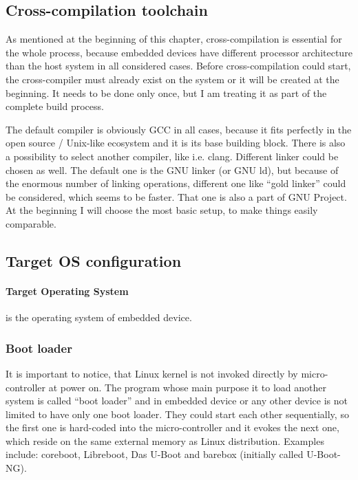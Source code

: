 \documentclass[printmode]{mgr}
\begin{document}
\subsection*{Cross-compilation toolchain}

As mentioned at the beginning of this chapter, cross-compilation is essential for the whole process, because embedded devices have different processor architecture than the host system in all considered cases. Before cross-compilation could start, the cross-compiler must already exist on the system or it will be created at the beginning. It needs to be done only once, but I am treating it as part of the complete build process.

The default compiler is obviously GCC in all cases, because it fits perfectly in the open source / Unix-like ecosystem and it is its base building block. There is also a possibility to select another compiler, like i.e. clang. Different linker could be chosen as well. The default one is the GNU linker (or GNU ld), but because of the enormous number of linking operations, different one like ``gold linker'' could be considered, which seems to be faster. That one is also a part of GNU Project. At the beginning I will choose the most basic setup, to make things easily comparable. 


\subsection*{Target OS configuration}

\paragraph{Target Operating System} is the operating system of embedded device.

\subsubsection{Boot loader}
It is important to notice, that Linux kernel is not invoked directly by micro-controller at power on. The program whose main purpose it to load another system is called ``boot loader'' and in embedded device or any other device is not limited to have only one boot loader. They could start each other sequentially, so the first one is hard-coded into the micro-controller and it evokes the next one, which reside on the same external memory as Linux distribution. Examples include: coreboot, Libreboot, Das U-Boot and barebox (initially called U-Boot-NG).
\end{document}
